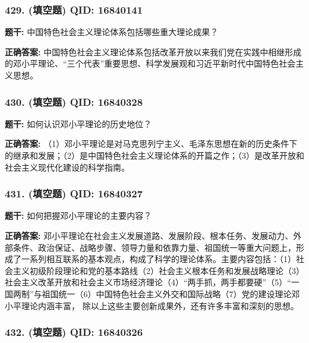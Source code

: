 \documentclass[12pt,UTF8]{ctexart}
\begin{document}
\subsubsection*{429. (填空题) \small QID: 16840141}

\textbf{题干:}
中国特色社会主义理论体系包括哪些重大理论成果？

\textbf{正确答案:}
中国特色社会主义理论体系包括改革开放以来我们党在实践中相继形成的邓小平理论、“三个代表”重要思想、科学发展观和习近平新时代中国特色社会主义思想。

\vspace{0.3em}\hrulefill\vspace{0.7em}

\subsubsection*{430. (填空题) \small QID: 16840328}

\textbf{题干:}
如何认识邓小平理论的历史地位？

\textbf{正确答案:}
（1）邓小平理论是对马克思列宁主义、毛泽东思想在新的历史条件下的继承和发展；（2）是中国特色社会主义理论体系的开篇之作；（3）是改革开放和社会主义现代化建设的科学指南。

\vspace{0.3em}\hrulefill\vspace{0.7em}

\subsubsection*{431. (填空题) \small QID: 16840327}

\textbf{题干:}
如何把握邓小平理论的主要内容？

\textbf{正确答案:}
邓小平理论在社会主义发展道路、发展阶段、根本任务、发展动力、外部条件、政治保证、战略步骤、领导力量和依靠力量、祖国统一等重大问题上，形成了一系列相互联系的基本观点，构成了科学的理论体系。主要内容包括：（1）社会主义初级阶段理论和党的基本路线（2）社会主义根本任务和发展战略理论（3）社会主义改革开放和社会主义市场经济理论（4）“两手抓，两手都要硬”（5）“一国两制”与祖国统一（6）中国特色社会主义外交和国际战略（7）党的建设理论邓小平理论内涵丰富， 除以上这些主要创新成果外，还有许多丰富和深刻的思想。

\vspace{0.3em}\hrulefill\vspace{0.7em}

\subsubsection*{432. (填空题) \small QID: 16840326}
\end{document}

